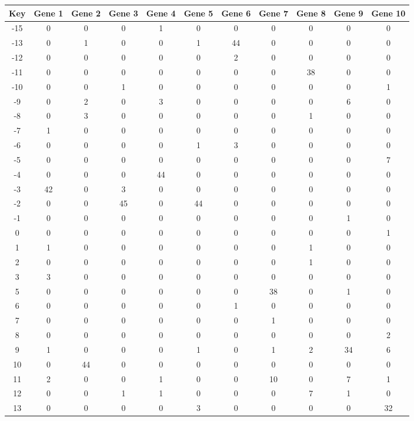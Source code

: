 \begin{tabular}{|c|c|c|c|c|c|c|c|c|c|c|}
\hline
Key & Gene 1 & Gene 2 & Gene 3 & Gene 4 & Gene 5 & Gene 6 & Gene 7 & Gene 8 & Gene 9 & Gene 10 \\
\hline
-15 & 0 & 0 & 0 & 1 & 0 & 0 & 0 & 0 & 0 & 0 \\
-13 & 0 & 1 & 0 & 0 & 1 & 44 & 0 & 0 & 0 & 0 \\
-12 & 0 & 0 & 0 & 0 & 0 & 2 & 0 & 0 & 0 & 0 \\
-11 & 0 & 0 & 0 & 0 & 0 & 0 & 0 & 38 & 0 & 0 \\
-10 & 0 & 0 & 1 & 0 & 0 & 0 & 0 & 0 & 0 & 1 \\
-9 & 0 & 2 & 0 & 3 & 0 & 0 & 0 & 0 & 6 & 0 \\
-8 & 0 & 3 & 0 & 0 & 0 & 0 & 0 & 1 & 0 & 0 \\
-7 & 1 & 0 & 0 & 0 & 0 & 0 & 0 & 0 & 0 & 0 \\
-6 & 0 & 0 & 0 & 0 & 1 & 3 & 0 & 0 & 0 & 0 \\
-5 & 0 & 0 & 0 & 0 & 0 & 0 & 0 & 0 & 0 & 7 \\
-4 & 0 & 0 & 0 & 44 & 0 & 0 & 0 & 0 & 0 & 0 \\
-3 & 42 & 0 & 3 & 0 & 0 & 0 & 0 & 0 & 0 & 0 \\
-2 & 0 & 0 & 45 & 0 & 44 & 0 & 0 & 0 & 0 & 0 \\
-1 & 0 & 0 & 0 & 0 & 0 & 0 & 0 & 0 & 1 & 0 \\
0 & 0 & 0 & 0 & 0 & 0 & 0 & 0 & 0 & 0 & 1 \\
1 & 1 & 0 & 0 & 0 & 0 & 0 & 0 & 1 & 0 & 0 \\
2 & 0 & 0 & 0 & 0 & 0 & 0 & 0 & 1 & 0 & 0 \\
3 & 3 & 0 & 0 & 0 & 0 & 0 & 0 & 0 & 0 & 0 \\
5 & 0 & 0 & 0 & 0 & 0 & 0 & 38 & 0 & 1 & 0 \\
6 & 0 & 0 & 0 & 0 & 0 & 1 & 0 & 0 & 0 & 0 \\
7 & 0 & 0 & 0 & 0 & 0 & 0 & 1 & 0 & 0 & 0 \\
8 & 0 & 0 & 0 & 0 & 0 & 0 & 0 & 0 & 0 & 2 \\
9 & 1 & 0 & 0 & 0 & 1 & 0 & 1 & 2 & 34 & 6 \\
10 & 0 & 44 & 0 & 0 & 0 & 0 & 0 & 0 & 0 & 0 \\
11 & 2 & 0 & 0 & 1 & 0 & 0 & 10 & 0 & 7 & 1 \\
12 & 0 & 0 & 1 & 1 & 0 & 0 & 0 & 7 & 1 & 0 \\
13 & 0 & 0 & 0 & 0 & 3 & 0 & 0 & 0 & 0 & 32 \\
\hline
\end{tabular}